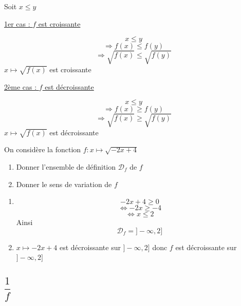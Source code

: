 \begin{preuve}
Soit $x\leq y$\newline

\underline{1er cas : $f$ est croissante}\newline

$$x \leq y$$
$$\Rightarrow f(x) \leq f(y)$$
$$\Rightarrow \sqrt{f(x)} \leq \sqrt{f(y)}$$
$x\mapsto \sqrt{f(x)}$ est croissante\newline

\underline{2ème cas : $f$ est décroissante}\newline

$$x \leq y$$
$$\Rightarrow f(x) \geq f(y)$$
$$\Rightarrow \sqrt{f(x)} \geq \sqrt{f(y)}$$
$x\mapsto \sqrt{f(x)}$ est décroissante\newline
\end{preuve}
\begin{exemple}
On considère la fonction $f:x\mapsto \sqrt{-2x+4}$
\begin{enumerate}
\item Donner l'ensemble de définition $\mathscr{D}_f$ de $f$
\item Donner le sens de variation de $f$
\end{enumerate}
\begin{enumerate}
\item $$-2x+4 \geq 0$$
$$\Leftrightarrow -2x \geq -4$$
$$\Leftrightarrow x \leq 2$$
Ainsi 
$$\mathscr{D}_f = ]-\infty,2]$$
\item $x\mapsto -2x+4$ est décroissante sur $]-\infty,2]$ donc $f$ est décroissante sur $]-\infty,2]$
\end{enumerate}
\end{exemple}
\subsection{$\dfrac{1}{f}$}
\newline

